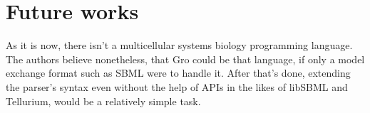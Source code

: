 \documentclass[12pt]{article}
\begin{document}
\section{Future works}
    As it is now, there isn't a multicellular systems biology programming language. The authors believe nonetheless, that Gro could be that language, if only a model exchange format such as SBML were to handle it. After that's done, extending the parser's syntax even without the help of APIs in the likes of libSBML and Tellurium, would be a relatively simple task.



\end{document}
